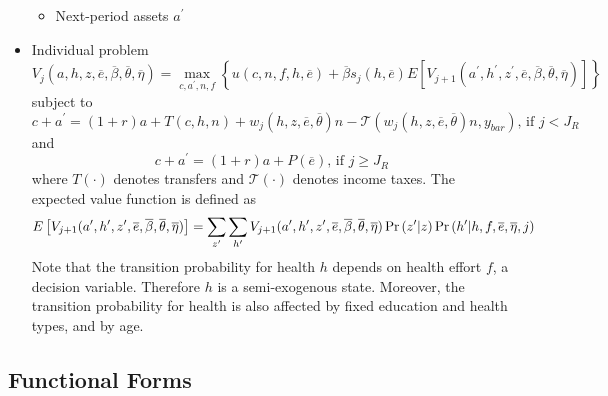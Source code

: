 \documentclass[12pt,a4paper]{article}
\begin{document}
\begin{itemize}
\begin{itemize}
\item Next-period assets $a^{\prime }$
\end{itemize}

\item Individual problem%
\begin{equation*}
V_{j}\left( a,h,z,\overline{e},\overline{\beta },\overline{\theta },%
\overline{\eta }\right) =\max_{c,a^{\prime },n,f}\left\{ u\left( c,n,f,h,%
\overline{e}\right) +\overline{\beta }s_{j}(h,\overline{e})E\left[
V_{j+1}(a^{\prime },h^{\prime },z^{\prime },\overline{e},\overline{\beta },%
\overline{\theta },\overline{\eta })\right] \right\} 
\end{equation*}%
subject to%
\begin{equation*}
c+a^{\prime }=(1+r)a+T(c,h,n)+w_{j}\left( h,z,\overline{e},\overline{\theta }%
\right) n-\mathcal{T}\left( w_{j}\left( h,z,\overline{e},\overline{\theta }%
\right) n,y_{bar}\right) \text{, if }j<J_{R}
\end{equation*}%
and%
\begin{equation*}
c+a^{\prime }=(1+r)a+P(\overline{e})\text{, if }j\geq J_{R}
\end{equation*}%
where $T\left( \cdot \right) $ denotes transfers and $\mathcal{T}\left(
\cdot \right) $ denotes income taxes. The expected value function is defined
as%
\begin{equation*}
E\left[ V_{j+1}(a^{\prime },h^{\prime },z^{\prime },\overline{e},\overline{%
\beta },\overline{\theta },\overline{\eta })\right] =\sum_{z^{\prime
}}\sum_{h^{\prime }}V_{j+1}(a^{\prime },h^{\prime },z^{\prime },\overline{e},%
\overline{\beta },\overline{\theta },\overline{\eta })\Pr \left( z^{\prime
}|z\right) \Pr \left( h^{\prime }|h,f,\overline{e},\overline{\eta },j\right) 
\end{equation*}%
Note that the transition probability for health $h$ depends on health effort 
$f$, a decision variable. Therefore $h$ is a semi-exogenous state. Moreover,
the transition probability for health is also affected by fixed education
and health types, and by age.
\end{itemize}

\subsection{Functional Forms}
\end{document}

